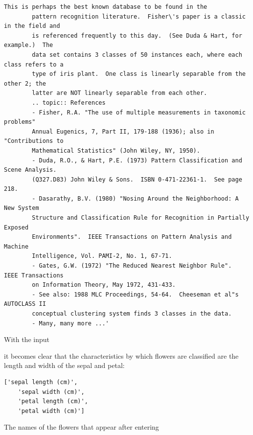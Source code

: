 \begin{code}
\begin{lstlisting}[numbers=none]
        This is perhaps the best known database to be found in the
        pattern recognition literature.  Fisher\'s paper is a classic in the field and
        is referenced frequently to this day.  (See Duda & Hart, for example.)  The
        data set contains 3 classes of 50 instances each, where each class refers to a
        type of iris plant.  One class is linearly separable from the other 2; the
        latter are NOT linearly separable from each other.
        .. topic:: References
        - Fisher, R.A. "The use of multiple measurements in taxonomic problems"
        Annual Eugenics, 7, Part II, 179-188 (1936); also in "Contributions to
        Mathematical Statistics" (John Wiley, NY, 1950).
        - Duda, R.O., & Hart, P.E. (1973) Pattern Classification and Scene Analysis.
        (Q327.D83) John Wiley & Sons.  ISBN 0-471-22361-1.  See page 218.
        - Dasarathy, B.V. (1980) "Nosing Around the Neighborhood: A New System
        Structure and Classification Rule for Recognition in Partially Exposed
        Environments".  IEEE Transactions on Pattern Analysis and Machine
        Intelligence, Vol. PAMI-2, No. 1, 67-71.
        - Gates, G.W. (1972) "The Reduced Nearest Neighbor Rule".  IEEE Transactions
        on Information Theory, May 1972, 431-433.
        - See also: 1988 MLC Proceedings, 54-64.  Cheeseman et al"s AUTOCLASS II
        conceptual clustering system finds 3 classes in the data.
        - Many, many more ...'
    \end{lstlisting}
    \caption{Information on the data set Iris from scikit-learn}
\end{code}


With the input

\medskip


\medskip

it becomes clear that the characteristics by which flowers are classified are the length and width of the sepal and petal:



\begin{lstlisting}[numbers=none]
    ['sepal length (cm)',
    'sepal width (cm)',
    'petal length (cm)',
    'petal width (cm)']
\end{lstlisting}

The names of the flowers that appear after entering

\medskip
{}

